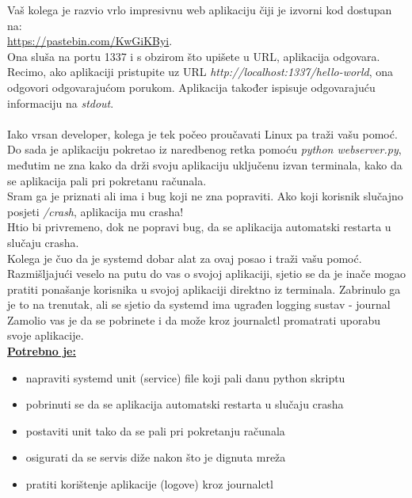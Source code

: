 \documentclass[12pt,a4paper]{article}
\begin{document}
Vaš kolega je razvio vrlo impresivnu web aplikaciju čiji je izvorni kod dostupan na: \\ \url{https://pastebin.com/KwGiKByi}. \\
Ona sluša na portu 1337 i s obzirom što upišete u URL, aplikacija odgovara. \\
Recimo, ako aplikaciji pristupite uz URL \textit{http://localhost:1337/hello-world}, ona odgovori odgovarajućom porukom.
Aplikacija također ispisuje odgovarajuću informaciju na \textit{stdout}. \\
\\
Iako vrsan developer, kolega je tek počeo proučavati Linux pa traži vašu pomoć.
Do sada je aplikaciju pokretao iz naredbenog retka pomoću \textit{python webserver.py},
međutim ne zna kako da drži svoju aplikaciju uključenu izvan terminala, kako da se aplikacija pali pri pokretanu računala. \\
Sram ga je priznati ali ima i bug koji ne zna popraviti. Ako koji korisnik slučajno posjeti \textit{/crash}, aplikacija mu crasha! \\
Htio bi privremeno, dok ne popravi bug, da se aplikacija automatski restarta u slučaju crasha. \\
Kolega je čuo da je systemd dobar alat za ovaj posao i traži vašu pomoć. \\
Razmišljajući veselo na putu do vas o svojoj aplikaciji, sjetio se da je inače mogao pratiti ponašanje korisnika u svojoj aplikaciji direktno iz terminala.
Zabrinulo ga je to na trenutak, ali se sjetio da systemd ima ugrađen logging sustav - journal \\
Zamolio vas je da se pobrinete i da može kroz journalctl promatrati uporabu svoje aplikacije. \\

\underline{\textbf{Potrebno je:}}
\begin{itemize}
	\item napraviti systemd unit (service) file koji pali danu python skriptu
	\item pobrinuti se da se aplikacija automatski restarta u slučaju crasha
	\item postaviti unit tako da se pali pri pokretanju računala
  \item osigurati da se servis diže nakon što je dignuta mreža
	\item pratiti korištenje aplikacije (logove) kroz journalctl
\end{itemize}


\newpage
\end{document}
